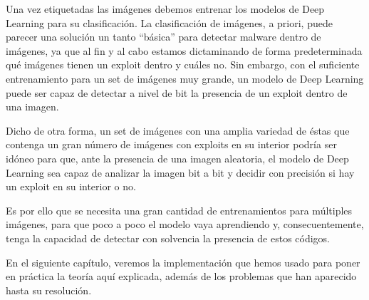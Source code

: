 Una vez etiquetadas las imágenes debemos entrenar los modelos de Deep Learning para su clasificación. La clasificación de imágenes, a priori, puede parecer una solución un tanto ``básica'' para detectar malware dentro de imágenes, ya que al fin y al cabo estamos dictaminando de forma predeterminada qué imágenes tienen un exploit dentro y cuáles no. Sin embargo, con el suficiente entrenamiento para un set de imágenes muy grande, un modelo de Deep Learning puede ser capaz de detectar a nivel de bit la presencia de un exploit dentro de una imagen.

Dicho de otra forma, un set de imágenes con una amplia variedad de éstas que contenga un gran número de imágenes con exploits en su interior podría ser idóneo para que, ante la presencia de una imagen aleatoria, el modelo de Deep Learning sea capaz de analizar la imagen bit a bit y decidir con precisión si hay un exploit en su interior o no.

Es por ello que se necesita una gran cantidad de entrenamientos para múltiples imágenes, para que poco a poco el modelo vaya aprendiendo y, consecuentemente, tenga la capacidad de detectar con solvencia la presencia de estos códigos.

En el siguiente capítulo, veremos la implementación que hemos usado para poner en práctica la teoría aquí explicada, además de los problemas que han aparecido hasta su resolución.